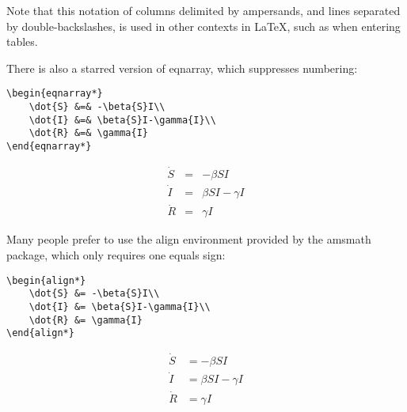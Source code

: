 Note that this notation of columns delimited by ampersands,
and lines separated by double-backslashes,
is used in other contexts in LaTeX, such as when entering tables.

There is also a starred version of eqnarray, which suppresses numbering:

\begin{verbatim}
\begin{eqnarray*}
    \dot{S}	&=& -\beta{S}I\\
    \dot{I}	&=& \beta{S}I-\gamma{I}\\
    \dot{R}	&=& \gamma{I}
\end{eqnarray*}
\end{verbatim}

\begin{eqnarray*}
    \dot{S}	&=& -\beta{S}I\\
    \dot{I}	&=& \beta{S}I-\gamma{I}\\
    \dot{R}	&=& \gamma{I}
\end{eqnarray*}

Many people prefer to use the align environment provided by the amsmath package,
which only requires one equals sign:

\begin{verbatim}
\begin{align*}
    \dot{S}	&= -\beta{S}I\\
    \dot{I}	&= \beta{S}I-\gamma{I}\\
    \dot{R}	&= \gamma{I}
\end{align*}
\end{verbatim}

\begin{align*}
    \dot{S}	&= -\beta{S}I\\
    \dot{I}	&= \beta{S}I-\gamma{I}\\
    \dot{R}	&= \gamma{I}
\end{align*}

